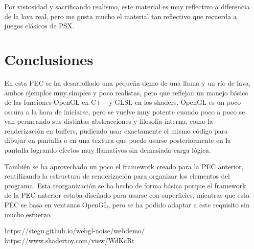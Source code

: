 \documentclass[12pt]{article}%
\begin{document}
	Por vistosidad y sacrificando realismo, este material es muy reflectivo a diferencia de la lava real, pero me gusta mucho el material tan reflectivo que recuerda a juegos clásicos de PSX.
	
%
	
	
\section{Conclusiones}
	En esta PEC se ha desarrollado una pequeña demo de una llama y un río de lava, ambos ejemplos muy simples y poco realistas, pero que reflejan un manejo básico de las funciones OpenGL en C++ y GLSL en los shaders. OpenGL es un poco oscura a la hora de iniciarse, pero se vuelve muy potente cuando poco a poco se van permeando sus distintas abstracciones y filosofía interna, como la renderización en buffers, pudiendo usar exactamente el mismo código para dibujar en pantalla o en una textura que puede usarse posteriormente en la pantalla logrando efectos muy llamativos sin demasiada carga lógica.
	
	También se ha aprovechado un poco el framework creado para la PEC anterior, reutilizando la estructura de renderización para organizar los elementos del programa. Esta reorganización se ha hecho de forma básica porque el framework de la PEC anterior estaba diseñado para usarse con superficies, mientras que esta PEC se basa en ventanas OpenGL, pero se ha podido adaptar a este requisito sin mucho esfuerzo.
	
	
\begin{thebibliography}{9}
 https://stegu.github.io/webgl-noise/webdemo/
 https://www.shadertoy.com/view/WdKcRt
\end{thebibliography}
\end{document}
